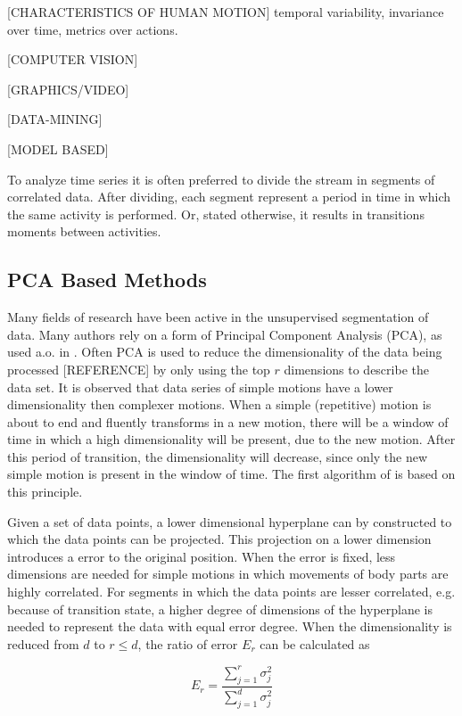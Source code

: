 [CHARACTERISTICS OF HUMAN MOTION]
temporal variability, invariance over time, metrics over actions.

[COMPUTER VISION]

[GRAPHICS/VIDEO]

[DATA-MINING]

[MODEL BASED]

To analyze time series it is often preferred to divide the stream in segments 
of correlated data. After dividing, each segment represent a period in time in 
which the same activity is performed. Or, stated otherwise, it results in 
transitions moments between activities.

\subsection{PCA Based Methods}

Many fields of research have been active in the unsupervised segmentation of 
data. Many authors rely on a form of Principal Component Analysis (PCA), as 
used a.o. in \cite{barbivc2004segmenting}. Often PCA is used to reduce the 
dimensionality of the data being processed [REFERENCE] by only using the top 
$r$ dimensions to describe the data set. It is observed that data series of 
simple motions have a lower dimensionality then complexer motions. When a 
simple (repetitive) motion is about to end and fluently transforms in a new 
motion, there will be a window of time in which a high dimensionality will be 
present, due to the new motion. After this period of transition, the 
dimensionality will decrease, since only the new simple motion is present in 
the window of time. The first algorithm of \cite{barbivc2004segmenting} is 
based on this principle.

Given a set of data points, a lower dimensional hyperplane can by constructed 
to which the data points can be projected. This projection on a lower 
dimension introduces a error to the original position. When the error is 
fixed, less dimensions are needed for simple motions in which movements of 
body parts are highly correlated. For segments in which the data points are 
lesser correlated, e.g. because of transition state, a higher degree of 
dimensions of the hyperplane is needed to represent the data with equal error 
degree. When the dimensionality is reduced from $d$ to $r \le d$, the ratio of 
error 
$E_r$ can be calculated as

\begin{equation}
	E_r = \frac{\sum_{j=1}^{r} \sigma_j^2}{\sum_{j=1}^{d} \sigma_j^2}
\end{equation}

